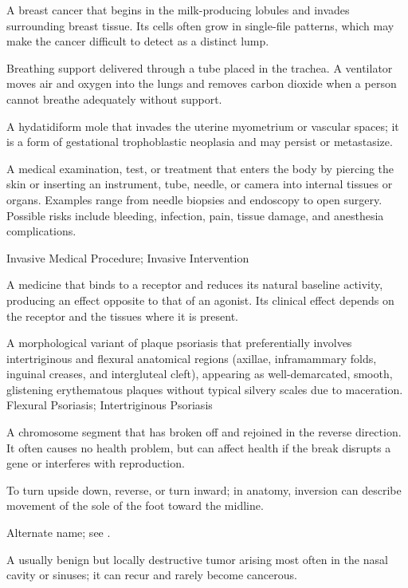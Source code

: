  A breast cancer that begins in the milk-producing lobules and invades surrounding breast tissue. Its cells often grow in single-file patterns, which may make the cancer difficult to detect as a distinct lump.

 Breathing support delivered through a tube placed in the trachea. A ventilator moves air and oxygen into the lungs and removes carbon dioxide when a person cannot breathe adequately without support.

 A hydatidiform mole that invades the uterine myometrium or vascular spaces; it is a form of gestational trophoblastic neoplasia and may persist or metastasize.

 A medical examination, test, or treatment that enters the body by piercing the skin or inserting an instrument, tube, needle, or camera into internal tissues or organs. Examples range from needle biopsies and endoscopy to open surgery. Possible risks include bleeding, infection, pain, tissue damage, and anesthesia complications.

\synonyms
Invasive Medical Procedure; Invasive Intervention

 A medicine that binds to a receptor and reduces its natural baseline activity, producing an effect opposite to that of an agonist. Its clinical effect depends on the receptor and the tissues where it is present.

 A morphological variant of plaque psoriasis that preferentially involves intertriginous and flexural anatomical regions (axillae, inframammary folds, inguinal creases, and intergluteal cleft), appearing as well-demarcated, smooth, glistening erythematous plaques without typical silvery scales due to maceration.
\synonyms
Flexural Psoriasis; Intertriginous Psoriasis

 A chromosome segment that has broken off and rejoined in the reverse direction. It often causes no health problem, but can affect health if the break disrupts a gene or interferes with reproduction.

 To turn upside down, reverse, or turn inward; in anatomy, inversion can describe movement of the sole of the foot toward the midline.

 Alternate name; see .

 A usually benign but locally destructive tumor arising most often in the nasal cavity or sinuses; it can recur and rarely become cancerous.

